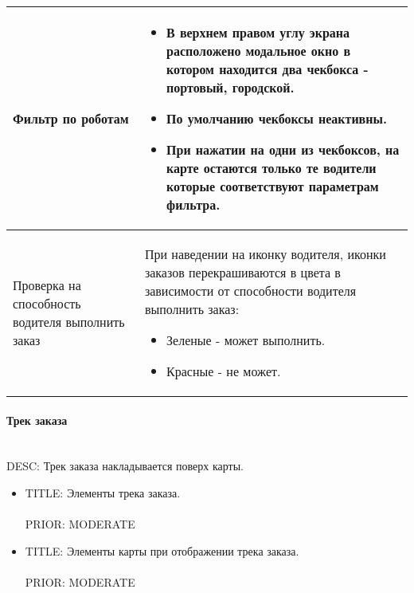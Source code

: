 \begin{longtable}{|p{4cm}|p{9cm}|}
				    \hline	Фильтр по роботам & \begin{itemize} \item В верхнем правом углу экрана расположено модальное окно в котором находится два чекбокса - портовый, городской. \item По умолчанию чекбоксы неактивны. \item При нажатии на одни из чекбоксов, на карте остаются только те водители которые соответствуют параметрам фильтра. \end{itemize}\\ [2mm]

				    \hline	Проверка на способность водителя выполнить заказ & При наведении на иконку водителя, иконки заказов перекрашиваются в цвета в зависимости от способности водителя выполнить заказ:
																				\begin{itemize} 
																					\item Зеленые - может выполнить.
																			   		\item Красные - не может.
																				\end{itemize}\\ [2mm]

					\hline 
				\end{longtable}

			\paragraph{Трек заказа} \label{order_track} \mbox{} \\

				DESC: Трек заказа накладывается поверх карты.

				\begin{itemize}

					\item{

						TITLE: Элементы трека заказа.\\
						\\
						PRIOR: MODERATE\\
					}

					\item{
						TITLE: Элементы карты при отображении трека заказа.\\
						\\
						PRIOR: MODERATE\\
					}

				\end{itemize}
				
